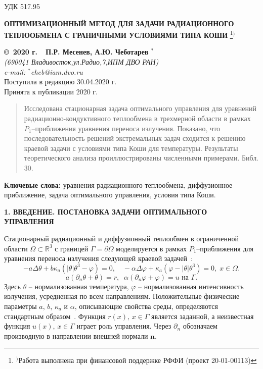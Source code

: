 \documentclass[12pt]{article}
\begin{document}
    УДК 517.95
    \begin{center}
    {\bf ОПТИМИЗАЦИОННЫЙ МЕТОД ДЛЯ ЗАДАЧИ РАДИАЦИОННОГО ТЕПЛООБМЕНА С ГРАНИЧНЫМИ УСЛОВИЯМИ ТИПА КОШИ}
        \footnote[{1}]{$^)$Работа выполнена при финансовой поддержке РФФИ (проект 20-01-00113)}$^)$
    \end{center}
    \begin{center}
    {\bf \copyright\  2020 г.\ \  П.Р. Месенев, А.Ю. Чеботарев $^{*}$}
        \\
        {\it (690041 Владивосток,ул.Радио,7,ИПМ ДВО РАН)\\
            e-mail:  $^{*}$cheb@iam.dvo.ru}\\
        {\small  Поступила в редакцию 30.04.2020 г.\\
            Принята к публикации 2020 г.}
    \end{center}

    \sloppy
    \begin{quote}
        \small
        Исследована стационарная задача оптимального управления для уравнений
        радиационно-кондуктивного теплообмена в трехмерной
        области в рамках $P_1$--приближения уравнения переноса излучения.
        Показано, что последовательность решений экстремальных задач
        сходится к решению краевой задачи с условиями типа Коши для температуры.
        Результаты теоретического анализа проиллюстрированы численными примерами.
        Библ.
        30.
    \end{quote}
    {\bf Ключевые слова:} уравнения радиационного теплообмена, диффузионное
    приближение, задача оптимального управления, условия типа Коши.

    \begin{center}
        \textbf{1. ВВЕДЕНИЕ.
        ПОСТАНОВКА ЗАДАЧИ ОПТИМАЛЬНОГО УПРАВЛЕНИЯ}
    \end{center}

    Стационарный радиационный и диффузионный теплообмен в
    ограниченной области $\Omega\subset \mathbb{R}^3$ с границей
    $\Gamma=\partial\Omega$ моделируется в рамках $P_1$--приближения для уравнения
    переноса излучения следующей
    краевой задачей~\cite{Modest,Kovt}:
    \begin{equation}
        \label{eq1}
        - a\Delta\theta + b\kappa_a(|\theta|\theta^3- \varphi)=0,   \quad
        -\alpha \Delta \varphi + \kappa_a(\varphi-|\theta|\theta^3)=0,\; x\in\Omega.
    \end{equation}
    \begin{equation}
        \label{bc1} a(\partial_n\theta+\theta) = r,\;\; \alpha(\partial_n\varphi+\varphi) = u \text{  на  }\Gamma.
    \end{equation}
    Здесь $\theta$ -- нормализованная температура, $\varphi$ --
    нормализованная интенсивность излучения, усредненная по всем
    направлениям.
    Положительные физические параметры $a$, $b$, $\kappa_a$ и $\alpha$, описывающие
    свойства среды, определяются стандартным образом~\cite{Kovt}.
    Функция $r(x),\, x\in\Gamma$ является заданной, а неизвестная функция $u(x),\, x\in\Gamma$
    играет роль управления.
    Через $\partial_n$ обозначаем производную в направлении внешней нормали $\mathbf n$.
\end{document}
